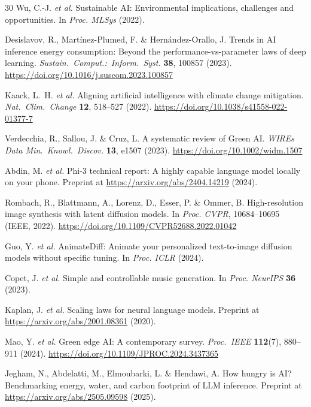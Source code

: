 \documentclass[11pt]{article}
\begin{document}
\begin{thebibliography}{30}
Wu, C.-J. \textit{et al.}
Sustainable AI: Environmental implications, challenges and opportunities.
In \textit{Proc. MLSys} (2022).

Desislavov, R., Mart\'{i}nez-Plumed, F. \& Hern\'{a}ndez-Orallo, J.
Trends in AI inference energy consumption: Beyond the performance-vs-parameter laws of deep learning.
\textit{Sustain.~Comput.:~Inform.~Syst.} \textbf{38}, 100857 (2023).
\url{https://doi.org/10.1016/j.suscom.2023.100857}

Kaack, L.~H. \textit{et al.}
Aligning artificial intelligence with climate change mitigation.
\textit{Nat.~Clim.~Change} \textbf{12}, 518--527 (2022).
\url{https://doi.org/10.1038/s41558-022-01377-7}

Verdecchia, R., Sallou, J. \& Cruz, L.
A systematic review of Green AI.
\textit{WIREs Data Min.~Knowl.~Discov.} \textbf{13}, e1507 (2023).
\url{https://doi.org/10.1002/widm.1507}

Abdin, M. \textit{et al.}
Phi-3 technical report: A highly capable language model locally on your phone.
Preprint at \url{https://arxiv.org/abs/2404.14219} (2024).

Rombach, R., Blattmann, A., Lorenz, D., Esser, P. \& Ommer, B.
High-resolution image synthesis with latent diffusion models.
In \textit{Proc. CVPR}, 10684--10695 (IEEE, 2022).
\url{https://doi.org/10.1109/CVPR52688.2022.01042}

Guo, Y. \textit{et al.}
AnimateDiff: Animate your personalized text-to-image diffusion models without specific tuning.
In \textit{Proc. ICLR} (2024).

Copet, J. \textit{et al.}
Simple and controllable music generation.
In \textit{Proc. NeurIPS} \textbf{36} (2023).

Kaplan, J. \textit{et al.}
Scaling laws for neural language models.
Preprint at \url{https://arxiv.org/abs/2001.08361} (2020).

Mao, Y. \textit{et al.}
Green edge AI: A contemporary survey.
\textit{Proc.~IEEE} \textbf{112}(7), 880--911 (2024).
\url{https://doi.org/10.1109/JPROC.2024.3437365}

Jegham, N., Abdelatti, M., Elmoubarki, L. \& Hendawi, A.
How hungry is AI? Benchmarking energy, water, and carbon footprint of LLM inference.
Preprint at \url{https://arxiv.org/abs/2505.09598} (2025).


\end{thebibliography}
\end{document}
